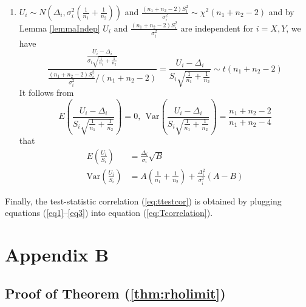 \documentclass[review]{elsarticle}
\newcommand{\var}{\text{Var}}
\begin{document}
\begin{enumerate}
	\item $U_i\sim N\left(\Delta_i, \sigma_i^2(\frac{1}{n_1} + \frac{1}{n_2})\right)$ and 
	$\frac{(n_1 + n_2 -2)S_i^2}{\sigma_i^2} \sim
	\chi^2(n_1 + n_2-2)$ and by Lemma \ref{lemmaIndep}  $U_i$ and $\frac{(n_1 + n_2 
		-2)S_i^2}{\sigma_i^2}$ are independent for $i = X, Y$, we have 
	\begin{equation}\tag{A.5}
	\frac{\frac{U_i-\Delta_i}{\sigma_i\sqrt{\frac{1}{n_1} + \frac{1}{n_2}}}}{\frac{(n_1 + 
			n_2-2)S_i^2}{\sigma_i^2}/(n_1 + n_2 -2)}  =
	\frac{U_i-\Delta_i}{S_i\sqrt{\frac{1}{n_1 } + \frac{1}{n_2}}}\sim t(n_1 + n_2-2)
	\end{equation}	
	It follows from 
	\begin{equation}\tag{A.6}
	E\left(\frac{U_i-\Delta_i}{S_i\sqrt{\frac{1}{n_1} + \frac{1}{n_2}}}\right)=0, ~~ 
	\text{Var}\left(\frac{U_i-\Delta_i}{S_i\sqrt{\frac{1}{n_1} + \frac{1}{n_2}}}\right) = 
	\frac{n_1 + n_2-2}{n_1 + n_2-4}
	\end{equation}
	that
	\begin{equation}\label{eq3}\tag{A.7}
	\begin{aligned}
	E\left(\frac{U_i}{S_i}\right) &= \frac{\Delta_i}{\sigma_i}\sqrt{B} \\
	\var\left(\frac{U_i}{S_i}\right)&=A\left(\frac{1}{n_1} + \frac{1}{n_2}\right) + 
	\frac{\Delta_i^2}{\sigma_i^2}(A-B)
	\end{aligned}
	\end{equation}
\end{enumerate}
Finally,  the test-statistic correlation (\ref{eq:ttestcor}) is obtained by plugging
equations (\ref{eq1}--\ref{eq3}) into equation (\ref{eq:Tcorrelation}).

\section*{Appendix B}\label{AppB}
\subsection*{Proof of Theorem (\ref{thm:rholimit})}
\end{document}
